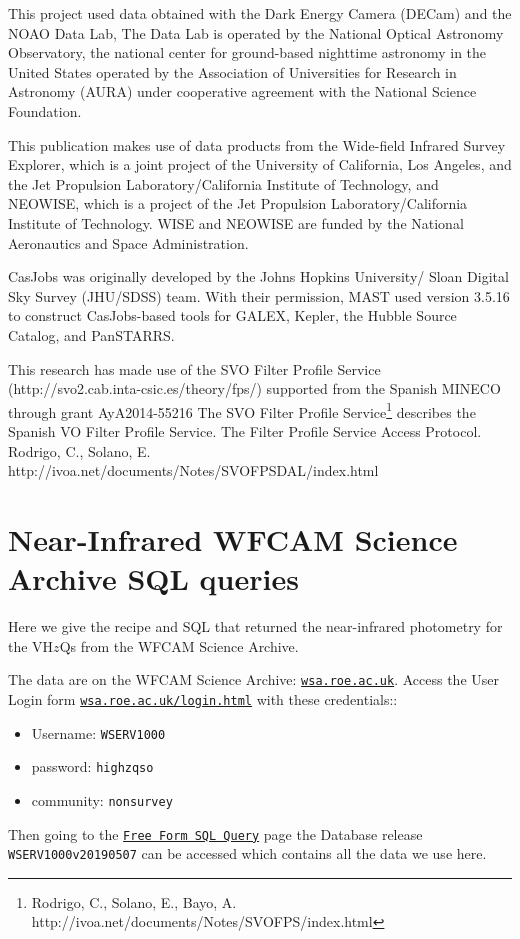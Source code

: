 \documentclass[usenatbib]{mnras}
\begin{document}
This project used data obtained with the Dark Energy Camera (DECam)
and the NOAO Data Lab, The Data Lab is operated by the National
Optical Astronomy Observatory, the national center for ground-based
nighttime astronomy in the United States operated by the Association
of Universities for Research in Astronomy (AURA) under cooperative
agreement with the National Science Foundation.

This publication makes use of data products from the Wide-field
Infrared Survey Explorer, which is a joint project of the University
of California, Los Angeles, and the Jet Propulsion
Laboratory/California Institute of Technology, and NEOWISE, which is a
project of the Jet Propulsion Laboratory/California Institute of
Technology. WISE and NEOWISE are funded by the National Aeronautics
and Space Administration.

CasJobs was originally developed by the Johns Hopkins University/
Sloan Digital Sky Survey (JHU/SDSS) team. With their permission, MAST
used version 3.5.16 to construct CasJobs-based tools for GALEX,
Kepler, the Hubble Source Catalog, and PanSTARRS.

This research has made use of the SVO Filter Profile Service
(http://svo2.cab.inta-csic.es/theory/fps/) supported from the Spanish
MINECO through grant AyA2014-55216 
The SVO Filter Profile Service\footnote{Rodrigo, C., Solano, E., Bayo, A. http://ivoa.net/documents/Notes/SVOFPS/index.html}
describes the Spanish VO Filter Profile Service. 
The Filter Profile Service Access Protocol. Rodrigo, C., Solano, E. http://ivoa.net/documents/Notes/SVOFPSDAL/index.html



\appendix

\section{Near-Infrared WFCAM Science Archive SQL queries}\label{sec:SQL_WSA}
Here we give the recipe and SQL that returned the near-infrared photometry 
for the VH$z$Qs from the  WFCAM Science Archive. 

The data are on the WFCAM Science Archive: \href{wsa.roe.ac.uk}{\tt wsa.roe.ac.uk}. 
Access the User Login form \href{WFCAM Science Archive}{\tt wsa.roe.ac.uk/login.html} 
with these credentials::
\begin{itemize}
    \item Username: {\tt WSERV1000} 
    \item password: {\tt highzqso} 
    \item community: {\tt nonsurvey}
\end{itemize}
Then going to the
\href{http://wsa.roe.ac.uk:8080/wsa/SQL_form.jsp}{{\tt Free Form SQL
Query}} page the Database release {\tt WSERV1000v20190507} can be
accessed which contains all the data we use here.
\end{document}
